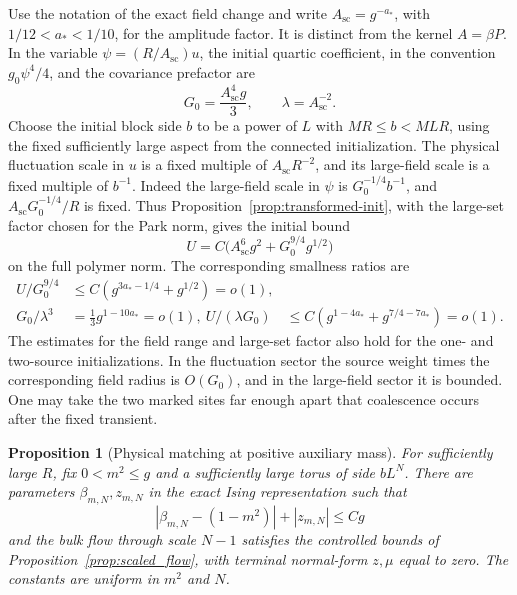 \documentclass[11pt]{article}
\newtheorem{proposition}{Proposition}[section]
\begin{document}
Use the notation of the exact field change and write
\(A_{\mathrm{sc}}=g^{-a_*}\), with
\(1/12<a_*<1/10\), for the amplitude factor. It is distinct
from the kernel \(A=\beta P\). In the variable
\(\psi=(R/A_{\mathrm{sc}})u\), the initial quartic coefficient,
in the convention \(g_0\psi^4/4\), and the covariance prefactor are
\[
 G_0=\frac{A_{\mathrm{sc}}^4g}{3},\qquad
 \lambda=A_{\mathrm{sc}}^{-2}.
\]
Choose the initial block side \(b\) to be a power of \(L\) with
\(M R\le b<MLR\), using the fixed sufficiently large aspect
from the connected initialization. The physical fluctuation
scale in \(u\) is a fixed multiple of \(A_{\mathrm{sc}} R^{-2}\),
and its large-field scale is a fixed multiple of \(b^{-1}\).
Indeed the large-field scale in \(\psi\) is
\(G_0^{-1/4}b^{-1}\), and
\(A_{\mathrm{sc}}G_0^{-1/4}/R\) is fixed.
Thus Proposition~\ref{prop:transformed-init}, with the large-set
factor chosen for the Park norm, gives the initial bound
\[
 U=C\big(A_{\mathrm{sc}}^6g^2+G_0^{9/4}g^{1/2}\big)
\]
on the full polymer norm. The corresponding smallness ratios are
\begin{align*}
 U/G_0^{9/4}
    &\le C(g^{3a_*-1/4}+g^{1/2})=o(1),\\
 G_0/\lambda^3&=\tfrac13g^{1-10a_*}=o(1),\
 U/(\lambda G_0)&\le
 C(g^{1-4a_*}+g^{7/4-7a_*})=o(1).
\end{align*}
The estimates for the field range and large-set factor also
hold for the one- and two-source initializations. In the
fluctuation sector the source weight times the corresponding
field radius is \(O(G_0)\), and in the large-field sector it
is bounded. One may take the two marked sites far enough apart
that coalescence occurs after the fixed transient.

\begin{proposition}[Physical matching at positive auxiliary mass]
\label{prop:physical-matching}
For sufficiently large \(R\), fix \(0<m^2\le g\) and a sufficiently
large torus of side \(bL^N\). There are parameters
\(\beta_{m,N},z_{m,N}\) in the exact Ising representation such that
\[
 |\beta_{m,N}-(1-m^2)|+|z_{m,N}|\le Cg
\]
and the bulk flow through scale \(N-1\) satisfies the controlled
bounds of Proposition~\ref{prop:scaled_flow}, with terminal
normal-form \(z,\mu\) equal to zero. The constants are uniform
in \(m^2\) and \(N\).
\end{proposition}
\end{document}
